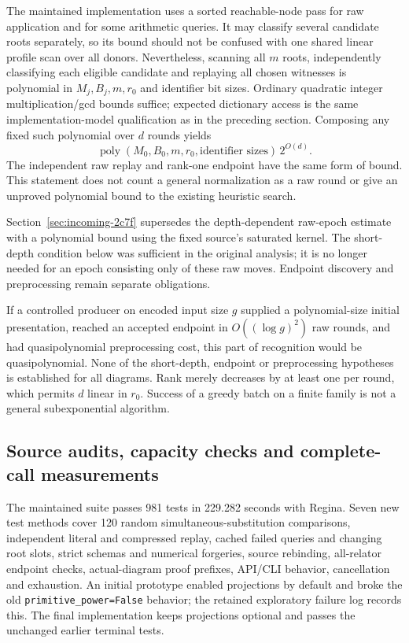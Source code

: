 The maintained implementation uses a sorted reachable-node pass for raw
application and for some arithmetic queries. It may classify several
candidate roots separately, so its bound should not be confused with one
shared linear profile scan over all donors. Nevertheless, scanning all
$m$ roots, independently classifying each eligible candidate and replaying
all chosen witnesses is polynomial in $M_j,B_j,m,r_0$ and identifier bit
sizes. Ordinary quadratic integer multiplication/gcd bounds suffice;
expected dictionary access is the same implementation-model qualification
as in the preceding section. Composing any fixed such polynomial over $d$
rounds yields
\[
 \operatorname{poly}(M_0,B_0,m,r_0,\text{identifier sizes})\,2^{O(d)}.
\]
The independent raw replay and rank-one endpoint have the same form of
bound. This statement does not count a general normalization as a raw
round or give an unproved polynomial bound to the existing heuristic search.

Section~\ref{sec:incoming-2c7f} supersedes the depth-dependent raw-epoch
estimate with a polynomial bound using the fixed source's saturated kernel.
The short-depth condition below was sufficient in the original analysis;
it is no longer needed for an epoch consisting only of these raw moves.
Endpoint discovery and preprocessing remain separate obligations.

If a controlled producer on encoded input size $g$ supplied a polynomial-size
initial presentation, reached an accepted endpoint in $O((\log g)^2)$ raw
rounds, and had quasipolynomial preprocessing cost, this part of recognition
would be quasipolynomial. None of the short-depth, endpoint or preprocessing
hypotheses is established for all diagrams. Rank merely decreases by at
least one per round, which permits $d$ linear in $r_0$. Success of a
greedy batch on a finite family is not a general subexponential algorithm.

\subsection{Source audits, capacity checks and complete-call measurements}

The maintained suite passes 981 tests in 229.282 seconds with Regina.
Seven new test methods cover 120 random simultaneous-substitution comparisons,
independent literal and compressed replay, cached failed queries and changing
root slots, strict schemas and numerical forgeries, source rebinding,
all-relator endpoint checks, actual-diagram proof prefixes, API/CLI behavior,
cancellation and exhaustion. An initial prototype enabled projections by
default and broke the old \texttt{primitive\_power=False} behavior; the
retained exploratory failure log records this. The final implementation
keeps projections optional and passes the unchanged earlier terminal tests.

